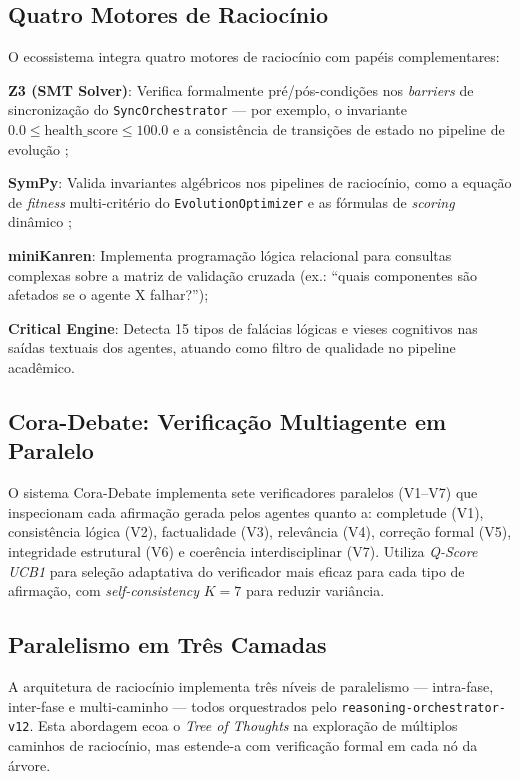 \documentclass[
  article,
  12pt,
  oneside,
  a4paper,
  brazil,
  sumario=tradicional
]{abntex2}
\begin{document}
\subsection{Quatro Motores de Raciocínio}

O ecossistema integra quatro motores de raciocínio com papéis complementares:

\begin{alineas}
\item \textbf{Z3 (SMT Solver)}: Verifica formalmente pré/pós-condições nos \emph{barriers} de sincronização do \texttt{SyncOrchestrator} --- por exemplo, o invariante $0.0 \leq \text{health\_score} \leq 100.0$ e a consistência de transições de estado no pipeline de evolução \cite{demoura2008z3};
\item \textbf{SymPy}: Valida invariantes algébricos nos pipelines de raciocínio, como a equação de \emph{fitness} multi-critério do \texttt{EvolutionOptimizer} e as fórmulas de \emph{scoring} dinâmico \cite{meurer2017sympy};
\item \textbf{miniKanren}: Implementa programação lógica relacional para consultas complexas sobre a matriz de validação cruzada (ex.: ``quais componentes são afetados se o agente X falhar?'');
\item \textbf{Critical Engine}: Detecta 15 tipos de falácias lógicas e vieses cognitivos nas saídas textuais dos agentes, atuando como filtro de qualidade no pipeline acadêmico.
\end{alineas}

\subsection{Cora-Debate: Verificação Multiagente em Paralelo}

O sistema Cora-Debate implementa sete verificadores paralelos (V1--V7) que inspecionam cada afirmação gerada pelos agentes quanto a: completude (V1), consistência lógica (V2), factualidade (V3), relevância (V4), correção formal (V5), integridade estrutural (V6) e coerência interdisciplinar (V7). Utiliza \emph{Q-Score UCB1} para seleção adaptativa do verificador mais eficaz para cada tipo de afirmação, com \emph{self-consistency} $K=7$ para reduzir variância.

\subsection{Paralelismo em Três Camadas}

A arquitetura de raciocínio implementa três níveis de paralelismo --- intra-fase, inter-fase e multi-caminho --- todos orquestrados pelo \texttt{reasoning-orchestrator-v12}. Esta abordagem ecoa o \emph{Tree of Thoughts} \cite{yao2023treeofthoughts} na exploração de múltiplos caminhos de raciocínio, mas estende-a com verificação formal em cada nó da árvore.
\end{document}
